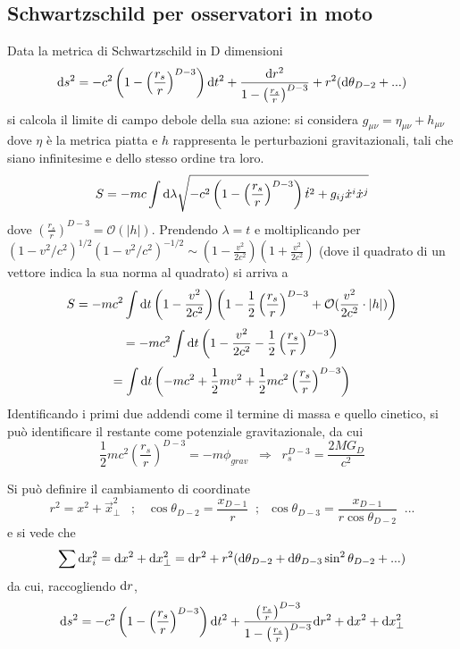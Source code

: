 \subsection{Schwartzschild per osservatori in moto}
Data la metrica di Schwartzschild in D dimensioni
\[  \mathrm{d} s^2 = -c^2 \left( 1- \left(\frac{r_s}{r}\right)^{D-3}\right) \mathrm{d} t^2 + \frac{\mathrm{d} r^2}{1- \left(\frac{r_s}{r}\right)^{D-3}} + r^2 (\mathrm{d} \theta_{D-2} + ...) \]
si calcola il limite di campo debole della sua azione: si considera \( g_{\mu\nu} = \eta_{\mu\nu} + h_{\mu\nu} \) dove $\eta$ \`e la metrica piatta e $h$ rappresenta le perturbazioni gravitazionali, tali che siano infinitesime e dello stesso ordine tra loro.
\[ S = -mc \int \mathrm{d} \lambda \sqrt{- c^2  \left( 1- \left(\frac{r_s}{r}\right)^{D-3} \right)  \dot{t}^2 + g_{ij} \dot{x}^i \dot{x}^j} \]
dove \( \left(\frac{r_s}{r}\right)^{D-3} = \mathcal{O}(|h|) \).
Prendendo \( \lambda = t \) e moltiplicando per 
\( (1-v^2/c^2)^{1/2} (1-v^2/c^2)^{-1/2} \sim \left(1-\frac{v^2}{2c^2}\right) \left(1+\frac{v^2}{2c^2}\right)\)
(dove il quadrato di un vettore indica la sua norma al quadrato) si arriva a 
\[ S = -mc^2 \int \mathrm{d} t  \left(1-\frac{v^2}{2c^2}\right) \left( 1 -\frac{1}{2} \left(\frac{r_s}{r}\right)^{D-3} + \mathcal{O}(\frac{v^2}{2c^2}\cdot |h|) \right) \]
\[ = -mc^2 \int \mathrm{d} t  \left(1-\frac{v^2}{2c^2} -\frac{1}{2} \left(\frac{r_s}{r}\right)^{D-3} \right)\]
\[ = \int \mathrm{d} t \left(  -mc^2  + \frac{1}{2}mv^2 + \frac{1}{2} mc^2\left(\frac{r_s}{r}\right)^{D-3} \right)\]
Identificando i primi due addendi come il termine di massa e quello cinetico, si pu\`o identificare il restante come potenziale gravitazionale, da cui
\[ \frac{1}{2} mc^2\left(\frac{r_s}{r}\right)^{D-3} = -m\phi_{grav} \;\;\Rightarrow \;\;r_s^{D-3} = \frac{2MG_D}{c^2} \]

Si pu\`o definire il cambiamento di coordinate
\[ r^2 = x^2 + \vec{x}^2_\perp \;\;\; ; \;\;\; \cos\theta_{D-2} = \frac{x_{D-1}}{r}  \;\; ; \;\; \cos\theta_{D-3} = \frac{x_{D-1}}{r\cos\theta_{D-2}} \;\; ...\] 
e si vede che 
\[ \sum \mathrm{d} x_i^2 = \mathrm{d} x^2 + \mathrm{d} x^2_\perp = \mathrm{d} r^2 + r^2(\mathrm{d} \theta_{D-2} + \mathrm{d} \theta_{D-3} \sin^2\theta_{D-2} + ... )\]
da cui, raccogliendo $\mathrm{d} r$,
\[  \mathrm{d} s^2 = -c^2 \left( 1- \left(\frac{r_s}{r}\right)^{D-3} \right) \mathrm{d} t^2 
    + \frac{     \left(\frac{r_s}{r}\right)^{D-3} }
           { 1-  \left(\frac{r_s}{r}\right)^{D-3} } \mathrm{d} r^2 
    +  \mathrm{d} x^2 + \mathrm{d} x^2_\perp  \]



